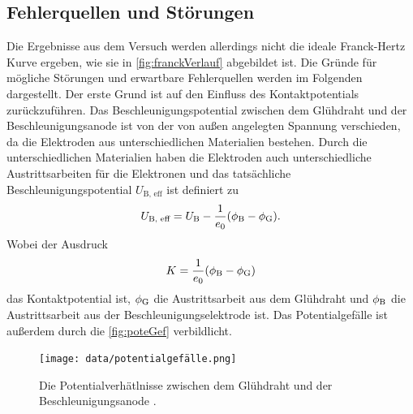 \subsection{Fehlerquellen und Störungen}
\label{subsec:fehlerStoerung}

Die Ergebnisse aus dem Versuch werden allerdings nicht die ideale Franck-Hertz Kurve ergeben, wie sie in \autoref{fig:franckVerlauf} abgebildet ist. Die Gründe für mögliche Störungen und erwartbare Fehlerquellen werden im Folgenden dargestellt. \newline
Der erste Grund ist auf den Einfluss des Kontaktpotentials zurückzuführen. Das Beschleunigungspotential zwischen dem Glühdraht und der Beschleunigungsanode ist von der von außen angelegten Spannung verschieden, da die Elektroden aus unterschiedlichen Materialien bestehen.
Durch die unterschiedlichen Materialien haben die Elektroden auch unterschiedliche Austrittsarbeiten für die Elektronen und das tatsächliche Beschleunigungspotential $U_{\text {B, eff}}$ ist definiert zu
\begin{align}
    U_{\text {B, eff}} = U_{\text B} - \frac{1}{e_0} (\phi_{\text B} - \phi_{\text G}).
    \label{eqn:potentialGef}
\end{align}
Wobei der Ausdruck
\begin{align}
    K = \frac{1}{e_0} (\phi_{\text B} - \phi_{\text G})
    \label{eqn:kont}
\end{align}
das Kontaktpotential ist, $\phi_{\text G}$ die Austrittsarbeit aus dem Glühdraht und $\phi_{\text B}$ die Austrittsarbeit aus der Beschleunigungselektrode ist.
Das Potentialgefälle ist außerdem durch die \autoref{fig:poteGef} verbildlicht.

\begin{figure}[H]
    \centering
    \texttt{[image: data/potentialgefälle.png]}
    \caption{Die Potentialverhätlnisse zwischen dem Glühdraht und der Beschleunigungsanode \cite{Anleitung601}.}
    \label{fig:poteGef}
\end{figure}

